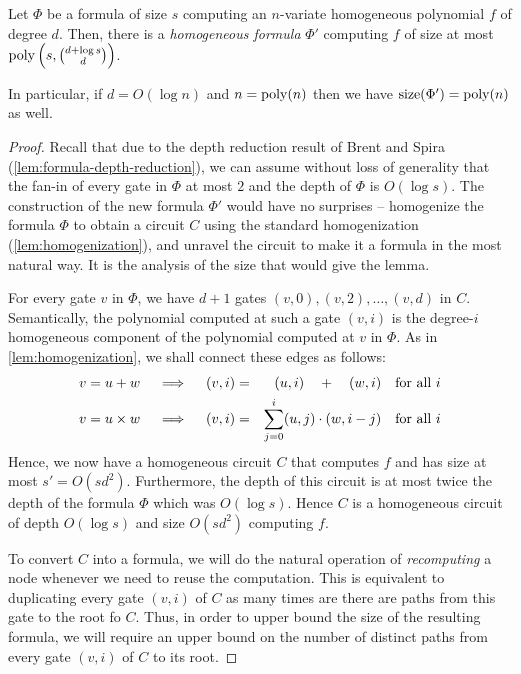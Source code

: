 \begin{lemma}\label{lem:formula-homogenization} Let $\Phi$ be a formula of size $s$ computing an $n$-variate homogeneous polynomial $f$ of degree $d$. Then, there is a \emph{homogeneous formula} $\Phi'$ computing $f$ of size at most $\operatorname{poly}\left(s,\binom{d+\log s}{d}\right)$. 

In particular, if $d = O(\log n)$ and $n = \operatorname{poly}(n)$ then we have $\mathrm{size}(\Phi') = \operatorname{poly}(n)$ as well. 
\end{lemma}
\begin{proof}
Recall that due to the depth reduction result of Brent and Spira (\autoref{lem:formula-depth-reduction}), we can assume without loss of generality that the fan-in of every gate in $\Phi$ at most $2$ and the depth of $\Phi$ is $O(\log s)$.
The construction of the new formula $\Phi'$ would have no surprises -- homogenize the formula $\Phi$ to obtain a circuit $C$ using the standard homogenization (\autoref{lem:homogenization}), and unravel the circuit to make it a formula in the most natural way. It is the analysis of the size that would give the lemma. 

\medskip

For every gate $v$ in $\Phi$, we have $d+1$ gates $(v, 0), (v, 2), \ldots, (v, d)$ in $C$.
Semantically, the polynomial computed at such a gate $(v, i)$ is the degree-$i$ homogeneous component of the polynomial computed at $v$ in $\Phi$. As in \autoref{lem:homogenization}, we shall connect these edges as follows:
\begin{eqnarray*}
v = u+w\quad\implies\quad (v, i) &=& (u, i) \quad + \quad (w,i)\quad\text{for all $i$}\\
v = u\times w\quad\implies\quad (v, i) &=& \sum_{j=0}^i (u,j)\cdot (w, {i-j}) \quad\text{for all $i$}
\end{eqnarray*}
Hence, we now have a homogeneous circuit $C$ that computes $f$ and has size at most $s' = O(sd^2)$. Furthermore, the depth of this circuit is at most twice the depth of the formula $\Phi$ which was $O(\log s)$. Hence $C$ is a homogeneous circuit of depth $O(\log s)$ and size $O(sd^2)$ computing $f$. 

To convert $C$ into a formula, we will do the natural operation of \emph{recomputing} a node whenever we need to reuse the computation. This is equivalent to duplicating every gate $(v,i)$ of $C$ as many times are there are paths from this gate to the root fo $C$.
Thus, in order to upper bound the size of the resulting formula, we will require an upper bound on the number of distinct paths from every gate $(v,i)$ of $C$ to its root.


\end{proof}
